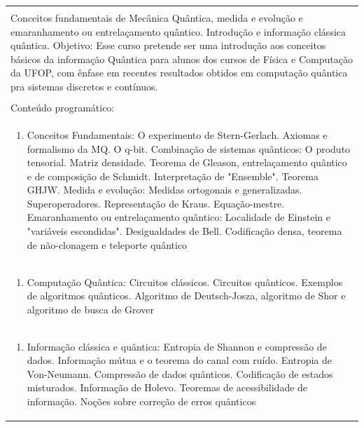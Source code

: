 \documentclass[11pt]{article}
\begin{document}
\begin{center}
\begin{longtable}{|p{4cm}|p{4cm}|p{4cm}|p{4cm}|}
\multicolumn{4}{|p{16cm}|}{}\\
\multicolumn{4}{|p{\dimexpr 16cm + 6\tabcolsep\relax}|}{Conceitos fundamentais de Mecânica Quântica, medida e evolução e emaranhamento ou entrelaçamento quântico. Introdução e informação clássica quântica. Objetivo: Esse curso pretende ser uma introdução aos conceitos básicos da informação Quântica para alunos dos cursos de Física e Computação da UFOP, com ênfase em recentes resultados obtidos em computação quântica pra sistemas discretos e contínuos.}\\
\multicolumn{4}{|p{16cm}|}{}\\
\hline
\multicolumn{4}{|p{16cm}|}{Conteúdo programático:}\\*
\multicolumn{4}{|p{\dimexpr 16cm + 6\tabcolsep\relax}|}{\begin{enumerate}[start=1]\item Conceitos Fundamentais: O experimento de Stern-Gerlach. Axiomas e formalismo da MQ. O q-bit. Combinação de sistemas quânticos: O produto tensorial. Matriz densidade. Teorema de Gleason, entrelaçamento quântico e de composição de Schmidt. Interpretação de "Ensemble". Teorema GHJW. Medida e evolução: Medidas ortogonais e generalizadas. Superoperadores. Representação de Kraus. Equação-mestre. Emaranhamento ou entrelaçamento quântico: Localidade de Einstein e "variáveis escondidas". Desigualdades de Bell. Codificação densa, teorema de não-clonagem e teleporte quântico\end{enumerate}}\\
\multicolumn{4}{|p{\dimexpr 16cm + 6\tabcolsep\relax}|}{\begin{enumerate}[start=2]\item Computação Quântica: Circuitos clássicos. Circuitos quânticos. Exemplos de algoritmos quânticos. Algoritmo de Deutsch-Josza, algoritmo de Shor e algoritmo de busca de Grover\end{enumerate}}\\
\multicolumn{4}{|p{\dimexpr 16cm + 6\tabcolsep\relax}|}{\begin{enumerate}[start=3]\item Informação clássica e quântica: Entropia de Shannon e compressão de dados. Informação mútua e o teorema do canal com ruído. Entropia de Von-Neumann. Compressão de dados quânticos. Codificação de estados misturados. Informação de Holevo. Teoremas de acessibilidade de informação. Noções sobre correção de erros quânticos\end{enumerate}}\\

\end{longtable}
\end{center}
\end{document}
